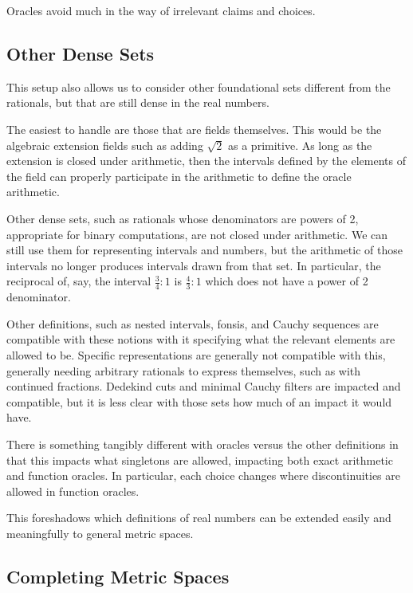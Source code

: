 \documentclass[12pt]{article}
\theoremstyle{remark}
\begin{document}
Oracles avoid much in the way of irrelevant claims and choices.

\subsection{Other Dense Sets}

This setup also allows us to consider other foundational sets different from the rationals, but that are still dense in the real numbers. 

The easiest to handle are those that are fields themselves. This would be the algebraic extension fields such as adding $\sqrt{2}$ as a primitive. As long as the extension is closed under arithmetic, then the intervals defined by the elements of the field can properly participate in the arithmetic to define the oracle arithmetic. 

Other dense sets, such as rationals whose denominators are powers of 2, appropriate for binary computations, are not closed under arithmetic. We can still use them for representing intervals and numbers, but the arithmetic of those intervals no longer produces intervals drawn from that set. In particular, the reciprocal of, say, the interval $\frac{3}{4}:1$ is $\frac{4}{3}:1$ which does not have a power of 2 denominator.  

Other definitions, such as nested intervals, fonsis, and Cauchy sequences are compatible with these notions with it specifying what the relevant elements are allowed to be. Specific representations are generally not compatible with this, generally needing arbitrary rationals to express themselves, such as with continued fractions. Dedekind cuts and minimal Cauchy filters are impacted and compatible, but it is less clear with those sets how much of an impact it would have. 

There is something tangibly different with oracles versus the other definitions in that this impacts what singletons are allowed, impacting both exact arithmetic and function oracles. In particular, each choice changes where discontinuities are allowed in function oracles. 

This foreshadows which definitions of real numbers can be extended easily and meaningfully to general metric spaces. 

\subsection{Completing Metric Spaces}
\end{document}
